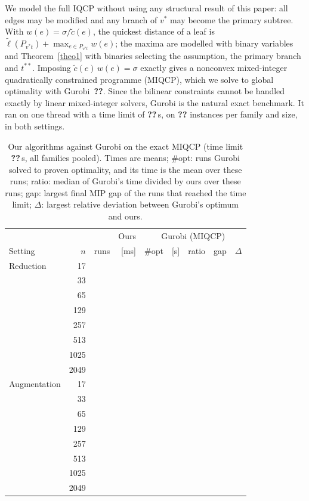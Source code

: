We model the full IQCP without using any structural result of this paper:
all edges may be modified and any branch of $v^*$ may become the primary
subtree. With $w(e)=\sigma/\tilde c(e)$, the quickest distance of a leaf is
$\tilde\ell(P_{v^*t})+\max_{e\in P_{v^*t}}w(e)$; the maxima are modelled with
binary variables and Theorem~\ref{theo1} with binaries selecting the
assumption, the primary branch and $t^{**}$. Imposing
$\tilde c(e)\,w(e)=\sigma$ exactly gives a nonconvex mixed-integer
quadratically constrained programme (MIQCP), which we solve to global
optimality with Gurobi~\textbf{??}. %
Since the bilinear constraints cannot be handled exactly by linear
mixed-integer solvers, Gurobi is the natural exact benchmark. It ran on one
thread with a time limit of \textbf{??}\,s, %
on \textbf{??} instances per family and size, in both settings. %

\begin{table}[htbp]
\centering
\small
\caption{Our algorithms against Gurobi on the exact MIQCP (time limit
\textbf{??}\,s, all families pooled). Times are means; \#opt: runs Gurobi
solved to proven optimality, and its time is the mean over these runs; ratio:
median of Gurobi's time divided by ours over these runs; gap: largest final
MIP gap of the runs that reached the time limit; $\Delta$: largest relative
deviation between Gurobi's optimum and ours.}
\label{tab:solvers}
\begin{tabular}{lrrr|rrrrr}
\hline
 & & & Ours & \multicolumn{5}{c}{Gurobi (MIQCP)} \\
Setting & $n$ & runs & [ms] & \#opt & [s] & ratio & gap & $\Delta$ \\
\hline
Reduction    &   17 & & & & & & & \\
             &   33 & & & & & & & \\
             &   65 & & & & & & & \\
             &  129 & & & & & & & \\
             &  257 & & & & & & & \\
             &  513 & & & & & & & \\
             & 1025 & & & & & & & \\
             & 2049 & & & & & & & \\
\hline
Augmentation &   17 & & & & & & & \\
             &   33 & & & & & & & \\
             &   65 & & & & & & & \\
             &  129 & & & & & & & \\
             &  257 & & & & & & & \\
             &  513 & & & & & & & \\
             & 1025 & & & & & & & \\
             & 2049 & & & & & & & \\
\hline
\end{tabular}
\end{table}

